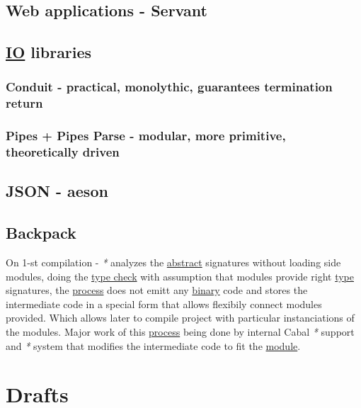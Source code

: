 \documentclass[a4paper,14pt,oneside]{book}
\begin{document}
\chapter{Web applications - Servant}
\label{sec:orgee743f7}

\chapter{\hyperref[orge72c061]{IO} libraries}
\label{sec:org4e9e1de}

\section{Conduit - practical, monolythic, guarantees termination return}
\label{sec:orgb6ee9c8}

\section{Pipes + Pipes Parse - modular, more primitive, theoretically driven}
\label{sec:org1f1b1b0}

\chapter{JSON - aeson}
\label{sec:orgdd856e5}

\chapter{\label{org3fadbd9}Backpack}
\label{sec:org6140284}
On 1-st compilation - \emph{*} analyzes the \hyperref[org308344c]{abstract} signatures without loading side modules, doing the \hyperref[org054b0aa]{type check} with assumption that modules provide right \hyperref[org73427ed]{type} signatures, the \hyperref[orgaeb58de]{process} does not emitt any \hyperref[orge8f1e92]{binary} code and stores the intermediate code in a special form that allows flexibily connect modules provided. Which allows later to compile project with particular instanciations of the modules. Major work of this \hyperref[orgaeb58de]{process} being done by internal Cabal \emph{*} support and \emph{*} system that modifies the intermediate code to fit the \hyperref[org7c9d90c]{module}.\\

\part{Drafts}
\label{sec:orge364003}
\end{document}
